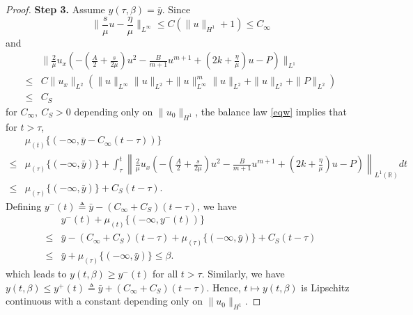 \documentclass[10pt]{article}
\numberwithin{equation}{section}
\begin{document}
\begin{proof}
		\textbf{Step 3.} Assume $y(\tau,\beta)=\bar{y}$. Since
		$$
		\|\frac{s}{\mu}u-\frac{\eta}{\mu}\|_{L^\infty}\leq C(\|u\|_{H^1}+1)\leq C_{\infty}
		$$
		and 
		\begin{align*}
			&\|\frac{2}{\mu}u_x\left(-\left(\frac A2+\frac{s}{2\mu}\right)u^2-\frac{B}{m+1}u^{m+1}+\left(2k+\frac{\eta}{\mu}\right)u-P\right)\|_{L^1}\\
			\leq&C\|u_x\|_{L^2}\left(\|u\|_{L^\infty}\|u\|_{L^2}+\|u\|_{L^\infty}^m\|u\|_{L^2}+\|u\|_{L^2}+\|P\|_{L^2}\right)\\
			\leq&C_S
		\end{align*}
		for $C_\infty,\ C_S>0$ depending only on $\|u_0\|_{H^1}$, the balance law \eqref{eqw} implies that for $t>\tau$, 
		\begin{align*}
			&\mu_{(t)}\{ (-\infty,\bar{y}-C_{\infty}(t-\tau))\}\\
			\leq& \mu_{(\tau)}\{(-\infty,\bar{y})\}+\int_{\tau}^{t}\left\|\frac{2}{\mu}u_x\left(-\left(\frac A2+\frac{s}{2\mu}\right)u^2-\frac{B}{m+1}u^{m+1}+\left(2k+\frac{\eta}{\mu}\right)u-P\right)\right\|_{L^{1}(\mathbb{R})} dt \\
			\leq& \mu_{(\tau)}\{(-\infty, \bar{y})\}+C_{S}(t-\tau) .
		\end{align*}
		Defining $y^{-}(t)\triangleq \bar{y}-(C_{\infty}+C_{S})(t-\tau)$, we have
		\begin{align*}
			& y^{-}(t)+\mu_{(t)}\{(-\infty , y^{-}(t))\} \\
			\leq& \bar{y}-(C_{\infty}+C_{S})(t-\tau)+\mu_{(\tau)}\{(-\infty , \bar{y})\}+C_{S}(t-\tau) \\
			\leq& \bar{y}+\mu_{(\tau)}\{(-\infty ,\bar{y})\} \leq \beta .
		\end{align*}
		which leads to $y(t,\beta)\geq y^{-}(t)$ for all $t>\tau$. Similarly, we have $y(t,\beta)\leq y^{+}(t)\triangleq \bar{y}+(C_{\infty}+C_{S})(t-\tau)$. Hence, $t\mapsto y(t,\beta)$ is  Lipschitz continuous with a constant depending only on $\|u_0\|_{H^1}$.		
	\end{proof}
	
\end{document}

